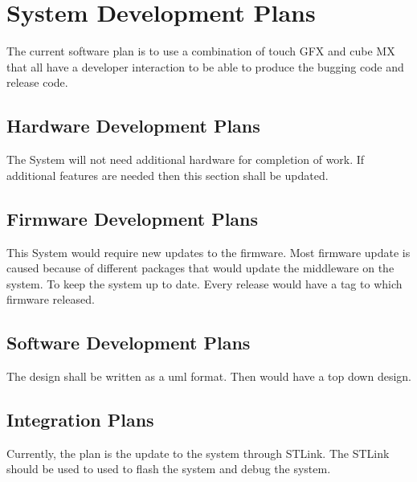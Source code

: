 
\chapter{System Development Plans}
\label{loc:PlansForSystemDevelopment}
% 

The current software plan is to use a combination of touch GFX and cube MX that all have a developer interaction to be able to produce the bugging code and release code.

\section{Hardware Development Plans}
\label{loc:SDP_HardwareDevelopmentPlans}
% 

The System will not need additional hardware for completion of work. If additional features are needed then this section shall be updated.

\section{Firmware Development Plans}
\label{loc:SDP_FirmwareDevelopmentPlans}
% 

This System would require new updates to the firmware. Most firmware update is caused because of different packages that would update the middleware on the system.
To keep the system up to date. Every release would have a tag to which firmware released.


\section{Software Development Plans}
\label{loc:SDP_SoftwareDevelopmentPlans}
% 

The design shall be written as a uml format. Then would have a top down design.

\section{Integration Plans}
\label{loc:SDP_IntegrationPlans}
% 

Currently, the plan is the update to the system through STLink. The STLink should be used to used to flash the system and debug the system.


